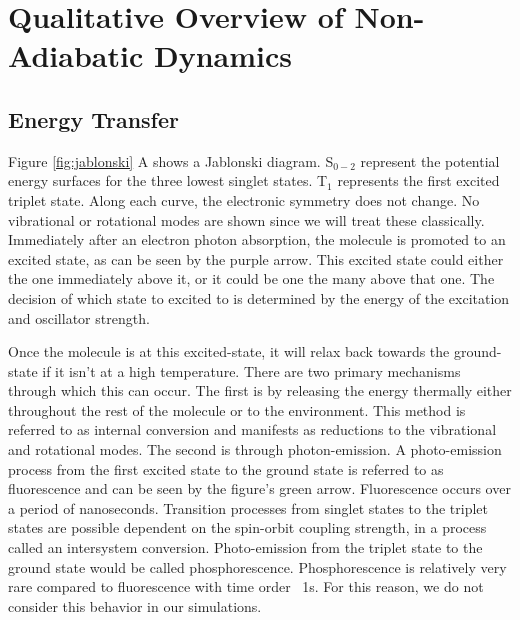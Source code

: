 \section{Qualitative Overview of Non-Adiabatic Dynamics}

\subsection{Energy Transfer}

\noindent
	  \begin{multiFigure} 
	    \label{fig:jablonski}
	  \end{multiFigure}
\bigskip

Figure \ref{fig:jablonski} A shows a Jablonski diagram.
S\(_{0-2}\) represent the potential energy surfaces for the three lowest singlet states.
T\(_1\) represents the first excited triplet state.
Along each curve, the electronic symmetry does not change.
No vibrational or rotational modes are shown since we will treat these classically.
Immediately after an electron photon absorption, the molecule is promoted to an excited state, as can be seen by the purple arrow.
This excited state could either the one immediately above it, or it could be one the many above that one.
The decision of which state to excited to is determined by the energy of the excitation and oscillator strength.

Once the molecule is at this excited-state, it will relax back towards the ground-state if it isn't at a high temperature.
There are two primary mechanisms through which this can occur.
The first is by releasing the energy thermally either throughout the rest of the molecule or to the environment. This method is referred to as internal conversion and manifests as reductions to the vibrational and rotational modes.
The second is through photon-emission.
A photo-emission process from the first excited state to the ground state is referred to as fluorescence and can be seen by the figure's green arrow.
Fluorescence occurs over a period of nanoseconds.
Transition processes from singlet states to the triplet states are possible dependent on the spin-orbit coupling strength, in a process called an intersystem conversion.
Photo-emission from the triplet state to the ground state would be called phosphorescence.
Phosphorescence is relatively very rare compared to fluorescence with time order ~1s.
For this reason, we do not consider this behavior in our simulations.

